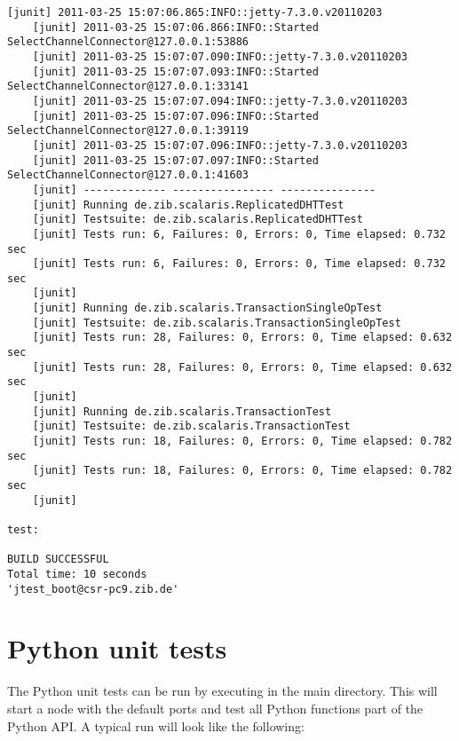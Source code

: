 \begin{lstlisting}[language={}]
    [junit] 2011-03-25 15:07:06.865:INFO::jetty-7.3.0.v20110203
    [junit] 2011-03-25 15:07:06.866:INFO::Started SelectChannelConnector@127.0.0.1:53886
    [junit] 2011-03-25 15:07:07.090:INFO::jetty-7.3.0.v20110203
    [junit] 2011-03-25 15:07:07.093:INFO::Started SelectChannelConnector@127.0.0.1:33141
    [junit] 2011-03-25 15:07:07.094:INFO::jetty-7.3.0.v20110203
    [junit] 2011-03-25 15:07:07.096:INFO::Started SelectChannelConnector@127.0.0.1:39119
    [junit] 2011-03-25 15:07:07.096:INFO::jetty-7.3.0.v20110203
    [junit] 2011-03-25 15:07:07.097:INFO::Started SelectChannelConnector@127.0.0.1:41603
    [junit] ------------- ---------------- ---------------
    [junit] Running de.zib.scalaris.ReplicatedDHTTest
    [junit] Testsuite: de.zib.scalaris.ReplicatedDHTTest
    [junit] Tests run: 6, Failures: 0, Errors: 0, Time elapsed: 0.732 sec
    [junit] Tests run: 6, Failures: 0, Errors: 0, Time elapsed: 0.732 sec
    [junit] 
    [junit] Running de.zib.scalaris.TransactionSingleOpTest
    [junit] Testsuite: de.zib.scalaris.TransactionSingleOpTest
    [junit] Tests run: 28, Failures: 0, Errors: 0, Time elapsed: 0.632 sec
    [junit] Tests run: 28, Failures: 0, Errors: 0, Time elapsed: 0.632 sec
    [junit] 
    [junit] Running de.zib.scalaris.TransactionTest
    [junit] Testsuite: de.zib.scalaris.TransactionTest
    [junit] Tests run: 18, Failures: 0, Errors: 0, Time elapsed: 0.782 sec
    [junit] Tests run: 18, Failures: 0, Errors: 0, Time elapsed: 0.782 sec
    [junit] 

test:

BUILD SUCCESSFUL
Total time: 10 seconds
'jtest_boot@csr-pc9.zib.de'
\end{lstlisting}

\section{Python unit tests}
The Python unit tests can be run by executing  in the
main directory. This will start a \scalaris{} node with the default ports and test
all Python functions part of the Python API. A typical run will look like the
following:


